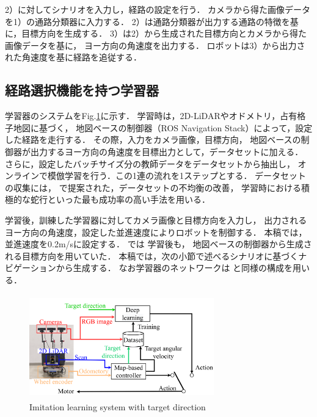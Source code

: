 \documentclass{sice-si}
\begin{document}
2）に対してシナリオを入力し，経路の設定を行う．
カメラから得た画像データを1）の通路分類器に入力する．
2）は通路分類器が出力する通路の特徴を基に，目標方向を生成する．
3）は2）から生成された目標方向とカメラから得た画像データを基に，
ヨー方向の角速度を出力する．
ロボットは3）から出力された角速度を基に経路を追従する．


\subsection{経路選択機能を持つ学習器}
学習器のシステムをFig.\ref{fig:learning}に示す．
学習時は，2D-LiDARやオドメトリ，占有格子地図に基づく，
地図ベースの制御器（ROS Navigation Stack\cite{ros-navigation}）によって，設定した経路を走行する．
その際，入力をカメラ画像，目標方向，
地図ベースの制御器が出力するヨー方向の角速度を目標出力として，データセットに加える．
さらに，設定したバッチサイズ分の教師データをデータセットから抽出し，
オンラインで模倣学習を行う．この1連の流れを1ステップとする．
データセットの収集には，
\cite{fujiwara2023}
で提案された，データセットの不均衡の改善，
学習時における積極的な蛇行といった最も成功率の高い手法を用いる．\par
学習後，訓練した学習器に対してカメラ画像と目標方向を入力し，
出力されるヨー方向の角速度，設定した並進速度によりロボットを制御する．
本稿では，並進速度を0.2m/sに設定する．
\cite{haruyama2022}\cite{fujiwara2023}では
学習後も，
地図ベースの制御器から生成される目標方向を用いていた．
本稿では，次の小節で述べるシナリオに基づくナビゲーションから生成する．
なお学習器のネットワークは
\cite{haruyama2022}\cite{fujiwara2023}
と同様の構成を用いる．
\begin{figure}[h!]
    \centering
     \includegraphics[height=45mm,width=80mm]{./figs/learning_gamma.png}
     \caption{Imitation learning system with target direction}\label{fig:learning}
\end{figure}
\end{document}
